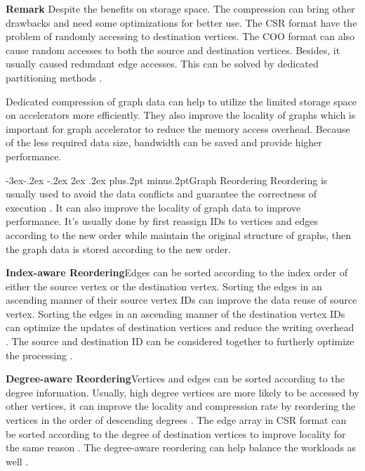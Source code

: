 \documentclass[twoside]{article}
\makeatletter
\def\subsection{\@startsection{subsection}{2}{\z@}%
 {-3ex\@plus -.2ex \@minus -.2ex}%
 {2ex \@plus.2ex}%
{\normalfont\normalsize\protect\baselineskip=12.5pt plus.2pt minus.2pt\bfseries}}
\makeatother
\begin{document}
\begin{multicols}{2}
{\bf Remark}
Despite the benefits on storage space. The compression can bring other drawbacks and need some optimizations for better use. The CSR format have the problem of randomly accessing to destination vertices. The COO format can also cause random accesses to both the source and destination vertices. Besides, it usually caused redundant edge accesses. This can be solved by dedicated partitioning methods \cite{Dai2017foregraph}.

Dedicated compression of graph data can help to utilize the limited storage space on accelerators more efficiently. They also improve the locality of graphs which is important for graph accelerator to reduce the memory access overhead. Because of the less required data size, bandwidth can be saved and provide higher performance.

\subsection{Graph Reordering}
Reordering is usually used to avoid the data conflicts and guarantee the correctness of execution \cite{zhou2016highthroughput,han2017reram}. It can also improve the locality of graph data to improve performance. It's usually done by first reassign IDs to vertices and edges according to the new order while maintain the original structure of graphs, then the graph data is stored according to the new order.

{\bf Index-aware Reordering}\quad Edges can be sorted according to the index order of either the source vertex or the destination vertex. Sorting the edges in an ascending manner of their source vertex IDs \cite{dai2018graphh} can improve the data reuse of source vertex. Sorting the edges in an ascending manner of the destination vertex IDs can optimize the updates of destination vertices and reduce the writing overhead \cite{zhou2016highthroughput}. The source and destination ID can be considered together to furtherly optimize the processing \cite{Dai2016fpgp,Dai2017foregraph,ham2016graphicionado}. 

{\bf Degree-aware Reordering}\quad Vertices and edges can be sorted according to the degree information. Usually, high degree vertices are more likely to be accessed by other vertices, it can improve the locality and compression rate by reordering the vertices in the order of descending degrees \cite{Zhang2018degreebfsfpga}. The edge array in CSR format can be sorted according to the degree of destination vertices to improve locality for the same reason \cite{Khoram2018fpgaco-optimizinghmc}. The degree-aware reordering can help balance the workloads as well \cite{Zhou2018fastcf}.


\end{multicols}
\end{document}

